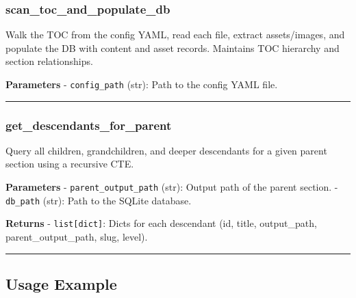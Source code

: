 \subsubsection{scan\_toc\_and\_populate\_db}\label{scan_toc_and_populate_db}

\begin{Shaded}
\begin{Highlighting}[]
\end{Highlighting}
\end{Shaded}

Walk the TOC from the config YAML, read each file, extract
assets/images, and populate the DB with content and asset records.
Maintains TOC hierarchy and section relationships.

\textbf{Parameters} - \texttt{config\_path} (str): Path to the config
YAML file.

\begin{center}\rule{0.5\linewidth}{0.5pt}\end{center}

\subsubsection{get\_descendants\_for\_parent}\label{get_descendants_for_parent}

\begin{Shaded}
\begin{Highlighting}[]
\end{Highlighting}
\end{Shaded}

Query all children, grandchildren, and deeper descendants for a given
parent section using a recursive CTE.

\textbf{Parameters} - \texttt{parent\_output\_path} (str): Output path
of the parent section. - \texttt{db\_path} (str): Path to the SQLite
database.

\textbf{Returns} - \texttt{list{[}dict{]}}: Dicts for each descendant
(id, title, output\_path, parent\_output\_path, slug, level).

\begin{center}\rule{0.5\linewidth}{0.5pt}\end{center}

\subsection{Usage Example}\label{usage-example}

